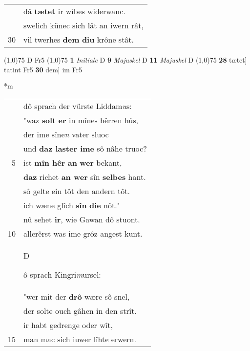 \documentclass[8pt,a4paper,notitlepage]{article}
\begin{document}
\begin{table}[ht]
\begin{minipage}[t]{0.5\linewidth}
\begin{tabular}{rl}
 & dâ \textbf{tætet} ir wîbes widerwanc.\\ 
 & swelich künec sich lât an iwern rât,\\ 
30 & vil twerhes \textbf{dem} \textbf{diu} krône stât.\\ 
\end{tabular}
\scriptsize
\line(1,0){75} \newline
D Fr5 \newline
\line(1,0){75} \newline
\textbf{1} \textit{Initiale} D  \textbf{9} \textit{Majuskel} D  \textbf{11} \textit{Majuskel} D  \newline
\line(1,0){75} \newline
\textbf{28} tætet] tatint Fr5 \textbf{30} dem] im Fr5 \newline
\end{minipage}
\hspace{0.5cm}
\begin{minipage}[t]{0.5\linewidth}
\small
\begin{center}*m
\end{center}
\begin{tabular}{rl}
 & dô sprach der vürste Liddam\textit{u}s:\\ 
 & "waz \textbf{solt} \textbf{er} in mînes hêrren hûs,\\ 
 & der ime sîne\textit{n} vater sluoc\\ 
 & und \textbf{daz laster ime} sô nâhe truoc?\\ 
5 & ist \textbf{mîn hêr} \textbf{an} \textbf{wer} bekant,\\ 
 & \textbf{daz} richet \textbf{an wer} sîn \textbf{selbes} hant.\\ 
 & sô gelte ein tôt den andern tôt.\\ 
 & ich wæne glîch \textbf{sîn} \textbf{die} nôt."\\ 
 & nû sehet \textbf{ir}, wie Gawan dô stuont.\\ 
10 & allerêrst was ime grôz angest kunt.\\ 
 & \begin{large}D\end{large}ô sprach Kingri\textit{m}ursel:\\ 
 & "wer mit der \textbf{drô} wære sô snel,\\ 
 & der solte ouch gâhen in den strît.\\ 
 & ir habt gedrenge oder wît,\\ 
15 & man mac sich iuwer lîhte erwern.\\ 

\end{tabular}
\end{minipage}
\end{table}
\end{document}
